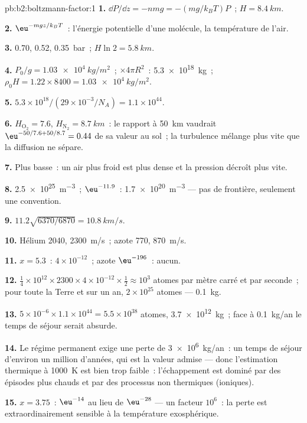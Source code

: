 \begin{solution}{pb:b2:boltzmann-factor:1}
\textbf{1.} $\dd P/\dd z = -nmg = -(mg/k_BT)P$~; $H = \qty{8.4}{km}$.

\textbf{2.} $\eu^{-mgz/k_BT}$~: l'énergie potentielle d'une molécule, la
température de l'air.

\textbf{3.} \qty{0.70}{}, \qty{0.52}{}, \qty{0.35}{bar}~; $H\ln 2 = \qty{5.8}{km}$.

\textbf{4.} $P_0/g = \qty{1.03e4}{kg/m^2}$~; $\times 4\pi R^2$~: \qty{5.3e18}{kg}~; $\rho_0H =
1.22 \times 8400 = \qty{1.03e4}{kg/m^2}$.

\textbf{5.} $5.3 \times 10^{18}/(29 \times 10^{-3}/N_A) = 1.1 \times 10^{44}$.

\textbf{6.} $H_{\text{O}_2} = 7.6$, $H_{\text{N}_2} = \qty{8.7}{km}$~: le rapport à \qty{50}{km}
vaudrait $\eu^{-50/7.6 + 50/8.7} = 0.44$ de sa valeur au sol~; la turbulence mélange
plus vite que la diffusion ne sépare.

\textbf{7.} Plus basse~: un air plus froid est plus dense et la pression décroît plus vite.

\textbf{8.} \qty{2.5e25}{m^{-3}}~; $\eu^{-11.9}$~: \qty{1.7e20}{m^{-3}} --- pas de frontière, seulement une
convention.

\textbf{9.} $11.2\sqrt{6370/6870} = \qty{10.8}{km/s}$.

\textbf{10.} Hélium \qty{2040}{}, \qty{2300}{m/s}~; azote \qty{770}{}, \qty{870}{m/s}.

\textbf{11.} $x = 5.3$~: $4 \times 10^{-12}$~; azote $\eu^{-196}$~: aucun.

\textbf{12.} $\tfrac14 \times 10^{12} \times 2300 \times 4 \times 10^{-12} \times \tfrac12 \approx
10^3$ atomes par mètre carré et par seconde~; pour toute la Terre et sur un an,
$2 \times 10^{25}$ atomes --- \qty{0.1}{kg}.

\textbf{13.} $5 \times 10^{-6} \times 1.1 \times 10^{44} = 5.5 \times 10^{38}$ atomes, \qty{3.7e12}{kg}~;
face à \qty{0.1}{kg/an} le temps de séjour serait absurde.

\textbf{14.} Le régime permanent exige une perte de \qty{3e6}{kg/an}~: un temps
de séjour d'environ un million d'années, qui est la valeur admise --- donc
l'estimation thermique à \qty{1000}{K} est bien trop faible~: l'échappement est
dominé par des épisodes plus chauds et par des processus non thermiques (ioniques).

\textbf{15.} $x = 3.75$~: $\eu^{-14}$ au lieu de $\eu^{-28}$ --- un facteur $10^6$~:
la perte est extraordinairement sensible à la température exosphérique.


\end{solution}
